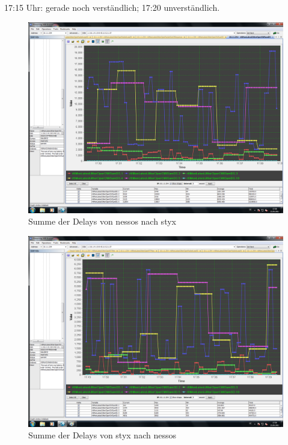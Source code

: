 \documentclass[a4paper,10pt]{scrartcl}
\begin{document}
17:15 Uhr: gerade noch verständlich; 17:20 unverständlich.

\begin{figure}[h]
 \centering
 \includegraphics[width=\textwidth]{./Bilder/C/oneway-delay-ds.png}
 \caption{Summe der Delays von nessos nach styx}
\end{figure}

\begin{figure}[h]
 \centering
 \includegraphics[width=\textwidth]{./Bilder/C/oneway-delay-sd.png}
 \caption{Summe der Delays von styx nach nessos}
\end{figure}
\end{document}
